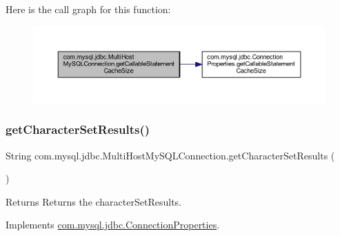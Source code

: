 Here is the call graph for this function\+:
\nopagebreak
\begin{figure}[H]
\begin{center}
\leavevmode
\includegraphics[width=350pt]{classcom_1_1mysql_1_1jdbc_1_1_multi_host_my_s_q_l_connection_ab0db994f2918b0c2f97e79fc57ca60a4_cgraph}
\end{center}
\end{figure}
\mbox{\label{classcom_1_1mysql_1_1jdbc_1_1_multi_host_my_s_q_l_connection_aaca38e46c6210e8784c710b30740e820}} 
\subsubsection{\texorpdfstring{get\+Character\+Set\+Results()}{getCharacterSetResults()}}
{\footnotesize\ttfamily String com.\+mysql.\+jdbc.\+Multi\+Host\+My\+S\+Q\+L\+Connection.\+get\+Character\+Set\+Results (\begin{DoxyParamCaption}{ }\end{DoxyParamCaption})}

\begin{DoxyReturn}{Returns}
Returns the character\+Set\+Results. 
\end{DoxyReturn}


Implements \mbox{\hyperlink{interfacecom_1_1mysql_1_1jdbc_1_1_connection_properties_a64a9d2f56ed041326aa829a7f665747a}{com.\+mysql.\+jdbc.\+Connection\+Properties}}.

